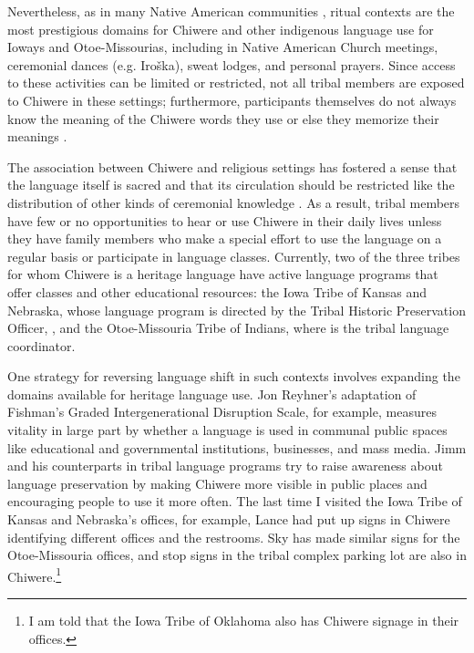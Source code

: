 \documentclass[output=paper]{LSP/langsci}
\begin{document}
Nevertheless, as in many Native American communities \citep[see e.g.][]{Kroskrity1998}, ritual contexts are the most prestigious domains for Chiwere and other indigenous language use for Ioways and Otoe-Missourias, including in Native American Church meetings, ceremonial dances (e.g. Iro\v{s}ka), sweat lodges, and personal prayers. Since access to these activities can be limited or restricted, not all tribal members are exposed to Chiwere in these settings; furthermore, participants themselves do not always know the meaning of the Chiwere words they use or else they memorize their meanings \citep[see e.g.][520--521]{Davidson1997}.

The association between Chiwere and religious settings has fostered a sense that the language itself is sacred and that its circulation should be restricted like the distribution of other kinds of ceremonial knowledge \citep{Davidson1997}. As a result, tribal members have few or no opportunities to hear or use Chiwere in their daily lives unless they have family members who make a special effort to use the language on a regular basis or participate in language classes. Currently, two of the three tribes for whom Chiwere is a heritage language have active language programs that offer classes and other educational resources: the Iowa Tribe of Kansas and Nebraska, whose language program is directed by the Tribal Historic Preservation Officer, , and the Otoe-Missouria Tribe of Indians, where  is the tribal language coordinator.

One strategy for reversing language shift in such contexts involves expanding the domains available for heritage language use. Jon Reyhner's \citeyearpar[vii]{Reyhner1999} adaptation of Fishman's \citeyearpar{Fishman1991} Graded Intergenerational Disruption Scale, for example, measures vitality in large part by whether a language is used in communal public spaces like educational and governmental institutions, businesses, and mass media. Jimm and his counterparts in tribal language programs try to raise awareness about language preservation by making Chiwere more visible in public places and encouraging people to use it more often. The last time I visited the Iowa Tribe of Kansas and Nebraska's offices, for example, Lance had put up signs in Chiwere identifying different offices and the restrooms. Sky has made similar signs for the Otoe-Missouria offices, and stop signs in the tribal complex parking lot are also in Chiwere.\footnote{I am told that the Iowa Tribe of Oklahoma also has Chiwere signage in their offices.}
\end{document}
